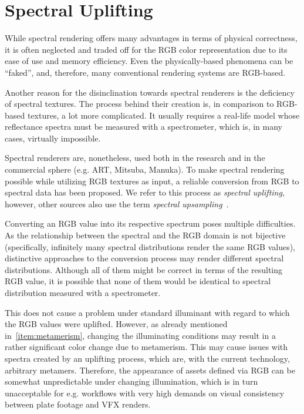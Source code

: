 \chapter{Spectral Uplifting} \label{chap:spectralUplifting}

While spectral rendering offers many advantages in terms of physical correctness, it is often neglected and traded off for the RGB color representation due to its ease of use and memory efficiency. Even the physically-based phenomena can be ``faked'', and, therefore, many conventional rendering systems are RGB-based. 

Another reason for the disinclination towards spectral renderers is the deficiency of spectral textures. The process behind their creation is, in comparison to RGB-based textures, a lot more complicated. It usually requires a real-life model whose reflectance spectra must be measured with a spectrometer, which is, in many cases, virtually impossible.  

Spectral renderers are, nonetheless, used both in the research and in the commercial sphere (e.g. ART, Mitsuba, Manuka). To make spectral rendering possible while utilizing RGB textures as input, a reliable conversion from RGB to spectral data has been proposed. We refer to this process as \emph{spectral uplifting}, however, other sources also use the term \emph{spectral upsampling}~\cite{upsamplingFluorescence}.

Converting an RGB value into its respective spectrum poses multiple difficulties. As the relationship between the spectral and the RGB domain is not bijective (specifically, infinitely many spectral distributions render the same RGB values), distinctive approaches to the conversion process may render different spectral distributions. Although all of them might be correct in terms of the resulting RGB value, it is possible that none of them would be identical to spectral distribution measured with a spectrometer.

This does not cause a problem under standard illuminant with regard to which the RGB values were uplifted. However, as already mentioned in~\cref{item:metamerism}, changing the illuminating conditions may result in a rather significant color change due to metamerism. This may cause issues with spectra created by an uplifting process, which are, with the current technology, arbitrary metamers. Therefore, the appearance of assets defined via RGB can be somewhat unpredictable under changing illumination, which is in turn unacceptable for e.g. workflows with very high demands on visual consistency between plate footage and VFX renders.


